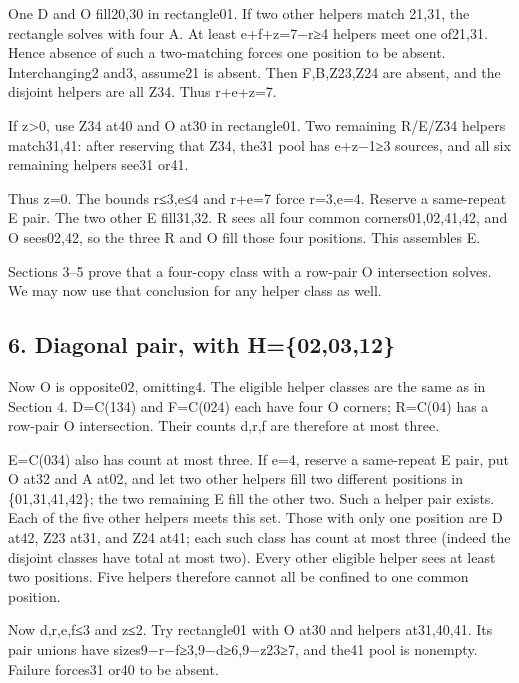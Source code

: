 \documentclass[
  10pt,
]{article}
\begin{document}
One D and O fill20,30 in rectangle01. If two other helpers
match 21,31, the rectangle solves with four A. At least e+f+z=7−r≥4
helpers meet one of21,31. Hence absence of such a two-matching forces
one position to be absent. Interchanging2 and3, assume21 is absent. Then
F,B,Z23,Z24 are absent, and the disjoint helpers are all Z34. Thus
r+e+z=7.

If z\textgreater0, use Z34 at40 and O at30 in rectangle01. Two
remaining R/E/Z34 helpers match31,41: after reserving that Z34, the31
pool has e+z−1≥3 sources, and all six remaining helpers see31 or41.

Thus z=0. The bounds r≤3,e≤4 and r+e=7 force r=3,e=4. Reserve a
same-repeat E pair. The two other E fill31,32. R sees all four common
corners01,02,41,42, and O sees02,42, so the three R and O fill those
four positions. This assembles E.

Sections 3--5 prove that a four-copy class with a row-pair O
intersection solves. We may now use that conclusion for any helper class
as well.

\hypertarget{diagonal-pair-with-h020312-1}{%
\subsection*{6. Diagonal pair, with
H=\{02,03,12\}}\label{diagonal-pair-with-h020312-1}}

Now O is opposite02, omitting4. The eligible helper classes
are the same as in Section 4. D=C(134) and F=C(024) each have four O
corners; R=C(04) has a row-pair O intersection. Their counts d,r,f are
therefore at most three.

E=C(034) also has count at most three. If e=4, reserve a same-repeat E
pair, put O at32 and A at02, and let two other helpers fill two
different positions in \{01,31,41,42\}; the two remaining E fill the
other two. Such a helper pair exists. Each of the five other helpers
meets this set. Those with only one position are D at42, Z23 at31, and
Z24 at41; each such class has count at most three (indeed the disjoint
classes have total at most two). Every other eligible helper sees at
least two positions. Five helpers therefore cannot all be confined to
one common position.

Now d,r,e,f≤3 and z≤2. Try rectangle01 with O at30 and helpers
at31,40,41. Its pair unions have sizes9−r−f≥3,9−d≥6,9−z23≥7, and the41
pool is nonempty. Failure forces31 or40 to be absent.
\end{document}
